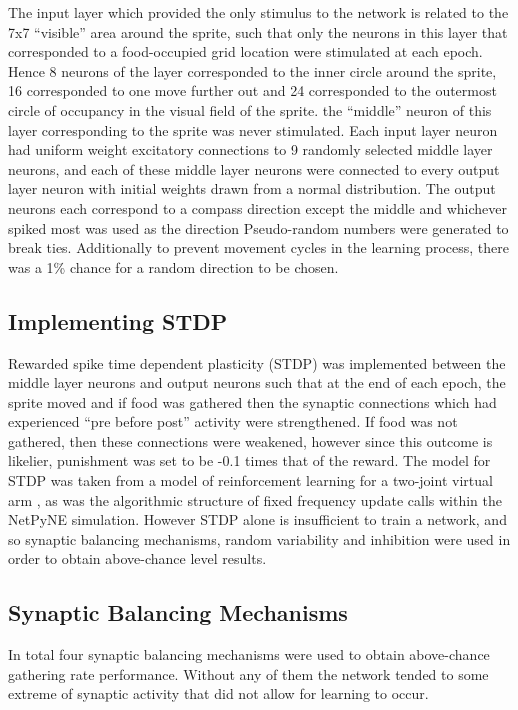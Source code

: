 \documentclass[11pt, twocolumn]{article}
\begin{document}
The input layer which provided the only stimulus to the network is related to the 7x7 ``visible'' area around the sprite, such that only the neurons in this layer that corresponded to a food-occupied grid location were stimulated at each epoch. Hence 8 neurons of the layer corresponded to the inner circle around the sprite, 16 corresponded to one move further out and 24 corresponded to the outermost circle of occupancy in the visual field of the sprite. the ``middle'' neuron  of this layer corresponding to the sprite was never stimulated. Each input layer neuron had uniform weight excitatory connections to 9 randomly selected middle layer neurons, and each of these middle layer neurons were connected to every output layer neuron with initial weights drawn from a normal distribution. The output neurons each correspond to a compass direction except the middle and whichever spiked most was used as the direction Pseudo-random numbers were generated to break ties. Additionally to prevent movement cycles in the learning process, there was a 1\% chance for a random direction to be chosen.

\subsection*{Implementing \acs{STDP}}
Rewarded spike time dependent plasticity (\acs{STDP}) was implemented between the middle layer neurons and output neurons such that at the end of each epoch, the sprite moved and if food was gathered then the synaptic connections which had experienced ``pre before post'' activity were strengthened. If food was not gathered, then these connections were weakened, however since this outcome is likelier, punishment was set to be -0.1 times that of the reward. The model for \acs{STDP} was taken from a model of reinforcement learning for a two-joint virtual arm \cite{neymotin2013reinforcement} \cite{chadderdon2012reinforcement}, as was the algorithmic structure of fixed frequency update calls within the NetPyNE simulation. However \acs{STDP} alone is insufficient to train a network, and so synaptic balancing mechanisms, random variability and inhibition were used in order to obtain above-chance level results.

\subsection*{Synaptic Balancing Mechanisms}
In total four synaptic balancing mechanisms were used to obtain above-chance gathering rate performance. Without any of them the network tended to some extreme of synaptic activity that did not allow for learning to occur.
\end{document}

